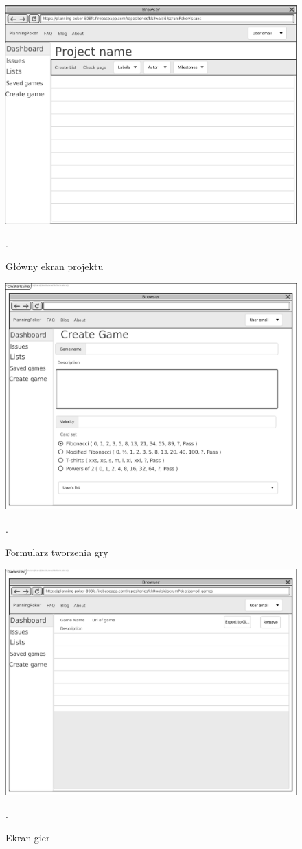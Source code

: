 \begin{figure}[H]
	\centering\includegraphics[width=.7\textwidth]{img/IssuesScreen.png}
	\caption{Główny ekran projektu}.\label{rys:IssuesScreen}
\end{figure}
\begin{figure}[H]
	\centering\includegraphics[width=.7\textwidth]{img/gameCreate.png}
	\caption{Formularz tworzenia gry}.\label{rys:gameCreate}
\end{figure}
\begin{figure}[H]
	\centering\includegraphics[width=.7\textwidth]{img/GamesList.png}
	\caption{Ekran gier}.\label{rys:GamesList}
\end{figure}
